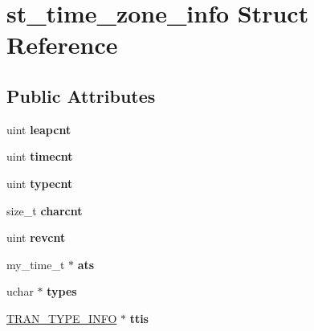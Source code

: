 \hypertarget{structst__time__zone__info}{}\section{st\+\_\+time\+\_\+zone\+\_\+info Struct Reference}
\label{structst__time__zone__info}
\subsection*{Public Attributes}
\begin{DoxyCompactItemize}
\item 
\mbox{\label{structst__time__zone__info_a165b31f4341e4ec67c7288f9dc51fcb3}} 
uint {\bfseries leapcnt}
\item 
\mbox{\label{structst__time__zone__info_a00adeb855f39511abd999669d93591eb}} 
uint {\bfseries timecnt}
\item 
\mbox{\label{structst__time__zone__info_a034c9cf352b97ff1cc86aca50fedc5e7}} 
uint {\bfseries typecnt}
\item 
\mbox{\label{structst__time__zone__info_a67b4937baeec9995f7d37300f04a5835}} 
size\+\_\+t {\bfseries charcnt}
\item 
\mbox{\label{structst__time__zone__info_a93e1b942228aac5f88dc37e460695b1d}} 
uint {\bfseries revcnt}
\item 
\mbox{\label{structst__time__zone__info_a1d5ba545113898361d6fc73e8d7e1657}} 
my\+\_\+time\+\_\+t $\ast$ {\bfseries ats}
\item 
\mbox{\label{structst__time__zone__info_add38478a36745061a10d75fde1ffc19f}} 
uchar $\ast$ {\bfseries types}
\item 
\mbox{\label{structst__time__zone__info_a4772a78eba5ae3d7703034537a795d92}} 
\mbox{\hyperlink{structttinfo}{T\+R\+A\+N\+\_\+\+T\+Y\+P\+E\+\_\+\+I\+N\+FO}} $\ast$ {\bfseries ttis}
\item 
\mbox{\label{structst__time__zone__info_a6b96383237794f392a79968b69ef2953}} 

\end{DoxyCompactItemize}
